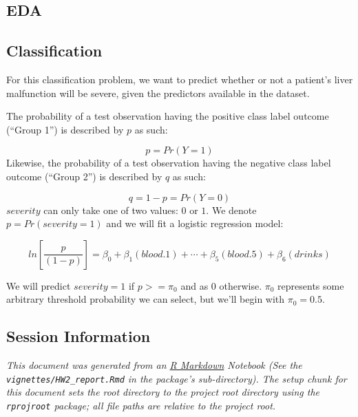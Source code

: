 \documentclass[
  11pt,
  a4paper,
]{scrartcl}
\begin{document}
\newpage

\hypertarget{eda}{%
\subsection{EDA}\label{eda}}

\newpage

\hypertarget{classification}{%
\subsection{Classification}\label{classification}}

For this classification problem, we want to predict whether or not a
patient's liver malfunction will be severe, given the predictors
available in the dataset.

The probability of a test observation having the positive class label
outcome (``Group 1'') is described by \(p\) as such:

\[
p = Pr(Y = 1)
\] Likewise, the probability of a test observation having the negative
class label outcome (``Group 2'') is described by \(q\) as such:

\[
q = 1 - p = Pr(Y = 0)
\] \(severity\) can only take one of two values: \(0\) or \(1\). We
denote \(p = Pr(severity = 1)\) and we will fit a logistic regression
model:

\[
ln[\frac{p}{(1-p)}] = \beta_0 + \beta_1(blood.1) + \cdots + \beta_5(blood.5) + \beta_6(drinks)
\]

We will predict \(severity = 1\) if \(p >= \pi_0\) and as \(0\)
otherwise. \(\pi_0\) represents some arbitrary threshold probability we
can select, but we'll begin with \(\pi_0 = 0.5\).

\newpage

\hypertarget{session-information}{%
\subsection{Session Information}\label{session-information}}

\emph{This document was generated from an
\href{http://rmarkdown.rstudio.com}{R Markdown} Notebook (See the
\texttt{vignettes/HW2\_report.Rmd} in the package's sub-directory). The
setup chunk for this document sets the root directory to the project
root directory using the \texttt{rprojroot} package; all file paths are
relative to the project root.}
\end{document}
